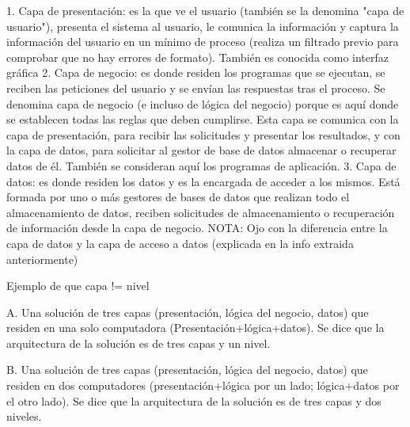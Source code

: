1. Capa de presentación: es la que ve el usuario (también se la denomina "capa de usuario"), presenta el sistema al usuario, le comunica 
la información y captura la información del usuario en un mínimo de proceso (realiza un filtrado previo para comprobar que no hay errores 
de formato). También es conocida como interfaz gráfica 
2. Capa de negocio: es donde residen los programas que se ejecutan, se reciben las peticiones del usuario y se envían las respuestas tras 
el proceso. Se denomina capa de negocio (e incluso de lógica del negocio) porque es aquí donde se establecen todas las reglas que deben 
cumplirse. Esta capa se comunica con la capa de presentación, para recibir las solicitudes y presentar los resultados, y con la capa de 
datos, para solicitar al gestor de base de datos almacenar o recuperar datos de él. También se consideran aquí los programas de aplicación.
3. Capa de datos: es donde residen los datos y es la encargada de acceder a los mismos. Está formada por uno o más gestores de bases de 
datos que realizan todo el almacenamiento de datos, reciben solicitudes de almacenamiento o recuperación de información desde la capa de 
negocio.
NOTA: Ojo con la diferencia entre la capa de datos y la capa de acceso a datos (explicada en la info extraida anteriormente)

Ejemplo de que capa != nivel

A. Una solución de tres capas (presentación, lógica del negocio, datos) que residen en una solo computadora (Presentación+lógica+datos). 
Se dice que la arquitectura de la solución es de tres capas y un nivel.

B. Una solución de tres capas (presentación, lógica del negocio, datos) que residen en dos computadores (presentación+lógica por un 
lado; lógica+datos por el otro lado). Se dice que la arquitectura de la solución es de tres capas y dos niveles. 


